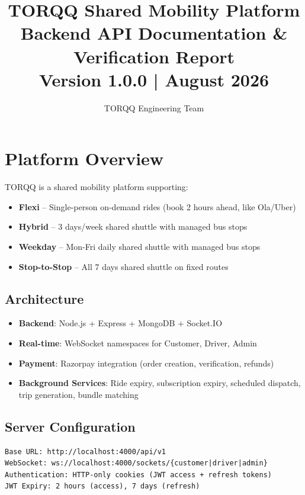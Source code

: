 \documentclass[11pt,a4paper]{article}
\title{
  \vspace{-2cm}
  \textbf{TORQQ Shared Mobility Platform}\\
  \Large{Backend API Documentation \& Verification Report}\\
  \vspace{0.5cm}
  \large{Version 1.0.0 | August 2026}
}
\author{TORQQ Engineering Team}
\date{}
\begin{document}
\maketitle
\tableofcontents
\newpage

\section{Platform Overview}

TORQQ is a shared mobility platform supporting:
\begin{itemize}
  \item \textbf{Flexi} -- Single-person on-demand rides (book 2 hours ahead, like Ola/Uber)
  \item \textbf{Hybrid} -- 3 days/week shared shuttle with managed bus stops
  \item \textbf{Weekday} -- Mon-Fri daily shared shuttle with managed bus stops
  \item \textbf{Stop-to-Stop} -- All 7 days shared shuttle on fixed routes
\end{itemize}

\subsection{Architecture}
\begin{itemize}
  \item \textbf{Backend}: Node.js + Express + MongoDB + Socket.IO
  \item \textbf{Real-time}: WebSocket namespaces for Customer, Driver, Admin
  \item \textbf{Payment}: Razorpay integration (order creation, verification, refunds)
  \item \textbf{Background Services}: Ride expiry, subscription expiry, scheduled dispatch, trip generation, bundle matching
\end{itemize}

\subsection{Server Configuration}
\begin{lstlisting}
Base URL: http://localhost:4000/api/v1
WebSocket: ws://localhost:4000/sockets/{customer|driver|admin}
Authentication: HTTP-only cookies (JWT access + refresh tokens)
JWT Expiry: 2 hours (access), 7 days (refresh)
\end{lstlisting}
\end{document}
